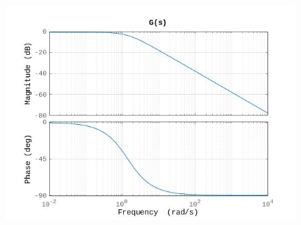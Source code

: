 \documentclass[12pt,italian]{article}
\begin{document}
\begin{figure}[h]
    \begin{center}
        \includegraphics[scale=0.6]{img/bode_GG.jpg}
    \end{center}    
\end{figure}
\end{document}
